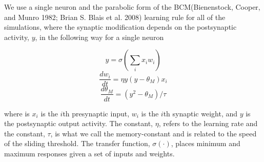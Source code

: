 \documentclass[
  letterpaper,
  DIV=11,
  numbers=noendperiod]{scrreprt}
\begin{document}
We use a single neuron and the parabolic form of the BCM(Bienenstock,
Cooper, and Munro 1982; Brian S. Blais et al. 2008) learning rule for
all of the simulations, where the synaptic modification depends on the
postsynaptic activity, \(y\), in the following way for a single neuron

\[
y=\sigma\left(\sum_i x_i w_i \right)
\] \[
\frac{dw_i}{dt} = \eta y(y-\theta_M) x_i
\] \[
\frac{d\theta_M}{dt} = (y^2-\theta_M)/\tau
\]

where is \(x_i\) is the \(i\)th presynaptic input, \(w_i\) is the
\(i\)th synaptic weight, and \(y\) is the postsynaptic output activity.
The constant, \(\eta\), refers to the learning rate and the constant,
\(\tau\), is what we call the memory-constant and is related to the
speed of the sliding threshold. The transfer function,
\(\sigma(\cdot)\), places minimum and maximum responses given a set of
inputs and weights.
\end{document}
